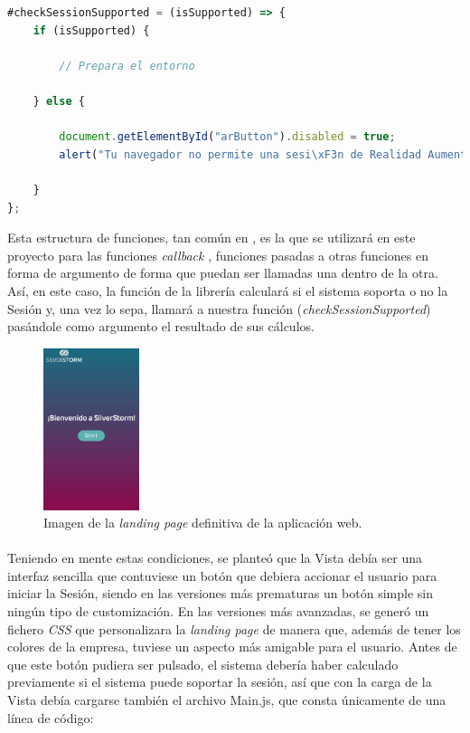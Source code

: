 \documentclass{subfiles}
\begin{document}
\begin{lstlisting}[language=JavaScript]
#checkSessionSupported = (isSupported) => {
    if (isSupported) {
    
        // Prepara el entorno
    
    } else {
    
        document.getElementById("arButton").disabled = true;
        alert("Tu navegador no permite una sesi\xF3n de Realidad Aumentada.");
        
    }
};
\end{lstlisting}

        Esta estructura de funciones, tan común en \js, es la que se utilizará en este proyecto para las funciones \textit{callback} \cite{web:callbackfunction}, funciones pasadas a otras funciones en forma de argumento de forma que puedan ser llamadas una dentro de la otra. Así, en este caso, la función de la librería calculará si el sistema soporta o no la Sesión y, una vez lo sepa, llamará a nuestra función (\textit{checkSessionSupported}) pasándole como argumento el resultado de sus cálculos.

        \begin{figure}
        \centering
        \includegraphics[width=0.25\textwidth]{img/landing_page.jpg}
        \caption{Imagen de la \textit{landing page} definitiva de la aplicación web.}
        \label{fig:landing_page}
        \end{figure}

        \paragraph{}
        Teniendo en mente estas condiciones, se planteó que la Vista debía ser una interfaz sencilla que contuviese un botón que debiera accionar el usuario para iniciar la Sesión, siendo en las versiones más prematuras un botón simple sin ningún tipo de customización. En las versiones más avanzadas, se generó un fichero \textit{CSS} que personalizara la \textit{landing page} de manera que, además de tener los colores de la empresa, tuviese un aspecto más amigable para el usuario. Antes de que este botón pudiera ser pulsado, el sistema debería haber calculado previamente si el sistema puede soportar la sesión, así que con la carga de la Vista debía cargarse también el archivo Main.js, que consta únicamente de una línea de código:
\end{document}
